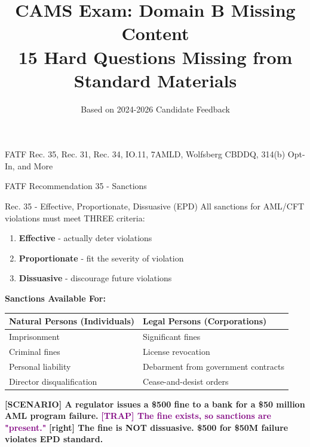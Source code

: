 \documentclass[11pt,a4paper]{beamer}
\title[CAMS Domain B - Missing Hard Questions]{CAMS Exam: Domain B Missing Content\\15 Hard Questions Missing from Standard Materials}
\author{Based on 2024-2026 Candidate Feedback}
\date{}
\newcommand{\trap}[1]{\textcolor{purple}{\textbf{[TRAP] #1}}}
\newcommand{\correct}[1]{\textcolor{green!50!black}{\textbf{[right] #1}}}
\newcommand{\scenario}[1]{\textcolor{blue!70!black}{\textbf{[SCENARIO] #1}}}
\begin{document}
\begin{frame}
\titlepage
\centering
\tiny FATF Rec. 35, Rec. 31, Rec. 34, IO.11, 7AMLD, Wolfsberg CBDDQ, 314(b) Opt-In, and More
\end{frame}


\begin{frame}{FATF Recommendation 35 - Sanctions}
\begin{block}{Rec. 35 - Effective, Proportionate, Dissuasive (EPD)}
All sanctions for AML/CFT violations must meet THREE criteria:
\begin{enumerate}
\item \textbf{Effective} - actually deter violations
\item \textbf{Proportionate} - fit the severity of violation
\item \textbf{Dissuasive} - discourage future violations
\end{enumerate}
\end{block}
\textbf{Sanctions Available For:}
\begin{tabular}{p{}|p{}}
\hline
\rowcolor{lightgray}
\textbf{Natural Persons (Individuals)} & \textbf{Legal Persons (Corporations)} \\
\hline
Imprisonment & Significant fines \\
Criminal fines & License revocation \\
Personal liability & Debarment from government contracts \\
Director disqualification & Cease-and-desist orders \\
\hline
\end{tabular}
\scenario{A regulator issues a \$500 fine to a bank for a \$50 million AML program failure.}
\trap{The fine exists, so sanctions are "present."}
\correct{The fine is NOT dissuasive. \$500 for \$50M failure violates EPD standard.}
\end{frame}
\end{document}
